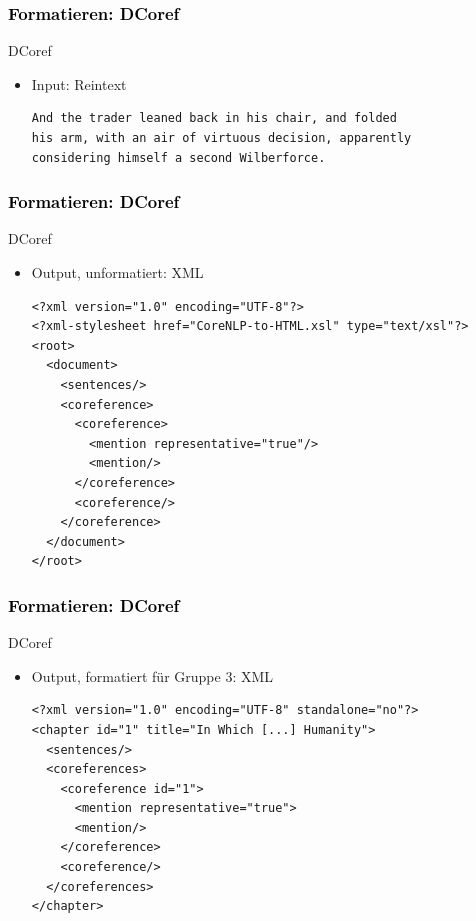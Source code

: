 \documentclass[xcolor=dvipsnames]{beamer}
\begin{document}

\begin{frame}[fragile]\frametitle{\textcolor{black}{Formatieren: DCoref}}

\begin{block}{DCoref}
\begin{itemize}
\item Input: Reintext
\begin{verbatim}
And the trader leaned back in his chair, and folded  
his arm, with an air of virtuous decision, apparently
considering himself a second Wilberforce. 
\end{verbatim}
\end{itemize}
\end{block}



\end{frame}


\begin{frame}[fragile]\frametitle{\textcolor{black}{Formatieren: DCoref}}

\begin{block}{DCoref}
\begin{itemize}
\item Output, unformatiert: XML
\begin{small}\begin{verbatim}
<?xml version="1.0" encoding="UTF-8"?>
<?xml-stylesheet href="CoreNLP-to-HTML.xsl" type="text/xsl"?>
<root>
  <document>
    <sentences/>
    <coreference>
      <coreference>
        <mention representative="true"/>
        <mention/>
      </coreference>
      <coreference/>
    </coreference>
  </document>
</root>
\end{verbatim}
\end{small}
\end{itemize}
\end{block}

\end{frame}


\begin{frame}[fragile]\frametitle{\textcolor{black}{Formatieren: DCoref}}

\begin{block}{DCoref}
\begin{itemize}
\item Output, formatiert für Gruppe 3: XML
\begin{small}\begin{verbatim}
<?xml version="1.0" encoding="UTF-8" standalone="no"?>
<chapter id="1" title="In Which [...] Humanity">
  <sentences/>
  <coreferences>
    <coreference id="1">
      <mention representative="true">
      <mention/>
    </coreference>
    <coreference/>
  </coreferences>
</chapter>
\end{verbatim}
\end{small}
\end{itemize}
\end{block}

\end{frame}
\end{document}
